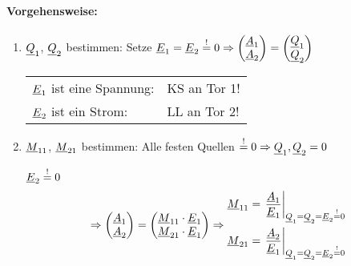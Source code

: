 \paragraph{Vorgehensweise:}
\begin{enumerate}[label=\arabic*)]
  \item {\boldmath$\underline{Q}_1$, $\underline{Q}_2$} bestimmen:
    Setze $\underline{E}_1 = \underline{E}_2 \stackrel{!}{=} 0
    \Rightarrow \begin{pmatrix}\underline{A}_1\\\underline{A}_2\end{pmatrix}
    =\begin{pmatrix}\underline{Q}_1\\\underline{Q}_2\end{pmatrix}$
    \begin{example}
      \begin{tabular}[t]{ll}
        $\underline{E}_1$ ist eine Spannung: & KS an Tor 1!  \\
        $\underline{E}_2$ ist ein Strom:     & LL an Tor 2!  \\
      \end{tabular}
    \end{example}

  \item {\boldmath$\underline{M}_{11}$, $\underline{M}_{21}$} bestimmen:
    Alle festen Quellen $\stackrel{!}{=} 0 \Rightarrow \underline{Q}_1, \underline{Q}_2 = 0$
    
    $\underline{E}_2 \stackrel{!}{=} 0$
    \[\Rightarrow\begin{pmatrix}\underline{A}_1\\\underline{A}_2\end{pmatrix}
      = \begin{pmatrix}
          \underline{M}_{11}\cdot\underline{E}_1\\
          \underline{M}_{21}\cdot\underline{E}_1
        \end{pmatrix}
      \Rightarrow\begin{aligned}
        \underline{M}_{11} = \left.\frac{\underline{A}_1}{\underline{E}_1}\right|_{
          \underline{Q}_1=\underline{Q}_2=\underline{E}_2\stackrel{!}{=}0}\\
        \underline{M}_{21} = \left.\frac{\underline{A}_2}{\underline{E}_1}\right|_{
          \underline{Q}_1=\underline{Q}_2=\underline{E}_2\stackrel{!}{=}0}
      \end{aligned}\]

% 
    

\end{enumerate}
